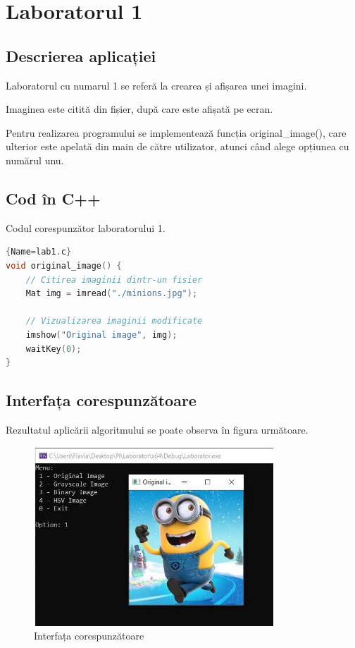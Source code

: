 \documentclass{amsart}
\begin{document}
\newpage

\section{Laboratorul 1}

\subsection{Descrierea aplicației}
\par
Laboratorul cu numarul 1 se referă la crearea și afișarea unei imagini.
\\ \par
Imaginea este citită din fișier, după care este afișată pe ecran.
\\ \par
Pentru realizarea programului se implementează funcția original\_image(), care ulterior este apelată din main de către utilizator, atunci când alege opțiunea cu numărul unu.

\subsection{Cod \^{i}n C++}

Codul corespunzător laboratorului 1.

\begin{lstlisting}[language=C++]{Name=lab1.c}
void original_image() {
	// Citirea imaginii dintr-un fisier
	Mat img = imread("./minions.jpg");

	// Vizualizarea imaginii modificate
	imshow("Original image", img);
	waitKey(0);
}
 \end{lstlisting}

\subsection{Interfața corespunzătoare}

Rezultatul aplic\u{a}rii algoritmului se poate observa \^{i}n figura următoare. 

\begin{figure}[h]
\includegraphics[width=9cm]{lab1.jpg}
\caption{Interfața corespunzătoare}
\label{fig1}
\end{figure}
\end{document}
